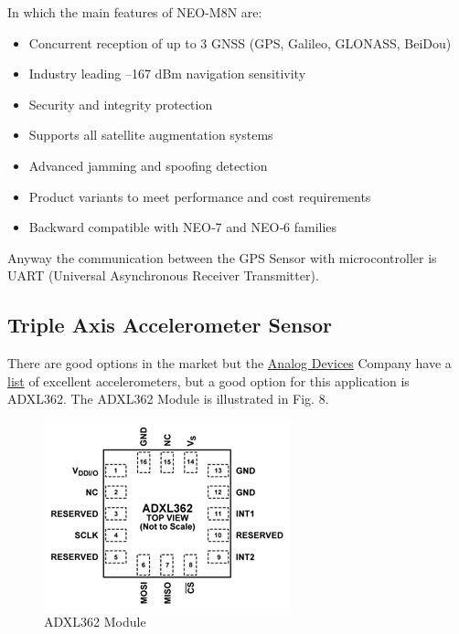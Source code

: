 \documentclass[10pt,journal,compsoc]{IEEEtran}
\begin{document}
\begin{enumerate}[\IEEEsetlabelwidth{2)}]
\hfil

In which the main features of NEO-M8N are:

\begin{itemize}
  \item Concurrent reception of up to 3 GNSS (GPS, Galileo, GLONASS, BeiDou)
  \item Industry leading –167 dBm navigation sensitivity
  \item Security and integrity protection
  \item Supports all satellite augmentation systems
  \item Advanced jamming and spoofing detection
  \item Product variants to meet performance and cost requirements
  \item Backward compatible with NEO‑7 and NEO‑6 families
\end{itemize}

\end{enumerate}

\hfil

Anyway the communication between the GPS Sensor with microcontroller is UART (Universal Asynchronous Receiver Transmitter).

\hfil

\subsection{Triple Axis Accelerometer Sensor}
There are good options in the market but the \href{http://www.analog.com/en/index.html}{Analog Devices} Company have a \href{http://www.analog.com/en/products/mems/accelerometers.html#accelerometers}{list} of excellent accelerometers, but a good option for this application is ADXL362. The ADXL362 Module is illustrated in Fig. 8.

\begin{figure}[h]
  \centering
  \captionsetup{justification=centering}
  \includegraphics[scale=.45]{es7}
  \caption{ADXL362 Module}
  \label{fig:fig8}
\end{figure}
\end{document}
